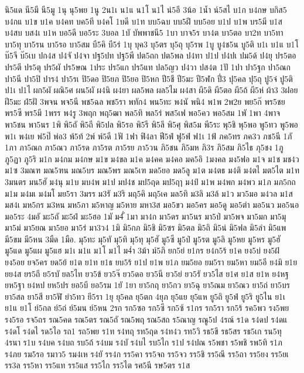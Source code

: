 {นิ5แด
นี5มี
นี5มู
1นุ
นุ5พย
1นู
2น1เ
น1แ
น1โ
น1ไ
น่5อี
3น้อ
1น้ำ
น์5สไ
บ1ก
บ4กษ
บกิส5
บ4กแ
บ1ข
บ1ค
บ4คท
บค5ที
บ4คโ
1บดี
บ1ท
บบ5ฉบ
บบ5ฝึ
บบ5อย
บ1ป
บ1พ
บร5มี
บ1ส
บ4สบ
บส4เ
บ1ห
บอ5ดี
บอ5ระ
3บอล
1บั
บัพพาชนี5
1บา
บาจ5ร
บา4ต
บา5ตอ
บา2ท
บา5ทา
บา5ทุ
บา5รน
บา5รอ
บา5สม
บี5คิ
บี5ร่
1บุ
บุค3
บุ5ตร
บุ5ถุ
บุ5รพ
1บู
บู4ช5น
บู5ติ
บ1เ
บ1แ
บ1โ
บ๊5จี
บ๊5เบ
ปก4ส
ป4จั
ป4จา
ปฐ5ปท
ปฐ5พี
ปต5ถก
ปต5พล
ป4ทา
ป1ป
ป4ปเ
ปม5ด้
ป4ยุ
ปร5ตอ
ปร5ตี
ปร5ตุ
ปร5ผั
ปร5ษณ
1ประ
ปร5แก
ปร5แท
ปล5ญว
ป4วา
ปส4ต
1ปั
1ปา
ปา5ฐก
ปา5ณก
ปา5นี
ปา5ปิ
ปาร4
ปา5รเ
ปิ5ดอ
ปิ5ยภ
ปิ5ยอ
ปิ5หก
ปี5ชี
ปี5มะ
ปี5ฬก
ปี่3
ปุ5คล
ปุ5ถุ
ปู5จ๋
ปู5ติ
ป1เ
ป1ไ
ผก5ผั
ผณิ5ศ
ผน5ผั
ผ4นิ
ผ4ยา
ผล5พล
ผล5ไม
ผ4สา
ผี5ดิ
ผี5ตอ
ผี5ถ้
ผี5ห่
ผ้า3
3ฝอย
ฝี5มะ
ฝ่5ฝั
3พจน
พจ5นี
พช5ฉล
พช5รา
พทัก4
พน5ทะ
พ4นั
พนิ4
พ1พ
2พ2ย
พย5ก๊
พร5ชย
พร5ซี
พร5มี
1พรร
พ4รู
3พฤก
พฤ5ฒา
พล5ทิ
พล5ร่
พส5เฟ
พอ5คว
พอ5สม
1พั
1พา
4พาจ
พา5ชน
พา5นร
1พิ
พิ5ถั
พิ5ถี
พิ5ปล
พิ5รอ
พิ5รี
พิ5ลึ
พิ5ศุ
พิส5ม
พี5ระ
พุ5ชิ
พุ5พอ
พู5ทว
พู5พอ
พ1เ
พ4เย
พ่5ป๊
พ่อ3
พ้5ท้
2พ์
พ์5ดี
1ฟั
1ฟา
ฟิ4ลา
ฟี5ฟ่
ฟู5ฟ่
ฟ1เ
1ฟ้
ภค5ทร
ภค3ว
ภช5นี
1ภั
1ภา
ภา5ณก
ภา5ณว
ภา5รด
ภา5รต
ภา5รย
ภา5วน
ภิ5ชน
ภิ5มห
ภิ3ร
ภิ5สม
ภิ5ไธ
ภุ5ชง
1ภู
ภู5ฏา
ภู5ริ
ม1ก
ม4กม
ม4กษ
ม1ข
ม4ขล
ม1ค
ม4คค
ม4คอ
มค5อิ
1มงคล
มง5ฟอ
ม1จ
ม1ช
มช4ว
ม1ซ
3มณฑ
มณ5ฑน
มณ5บร
มณ5พร
มณ5เฑ
มด5ยอ
มด5ลู
ม1ต
ม4ตธ
ม4ติ
ม4ตไ
มต5ไต
ม1ท
3มนตร
มน5ฮั
ม4นุ
ม1บ
มบ4พ
ม1ป
มป4ช
มป5ฤด
มป5ฤๅ
ม4ป์
ม1พ
ม4พก
ม4พว
ม1ภ
มภ5กถ
ม1ม
ม4มเ
ม4มโ
มย5รา
3มรร
ม3รั
ม3ริ
มฤ5คิ
มฤ5เค
มล5ทิ
ม3ลิ
ม3ล้
ม1ว
มว5มอ
ม4วล
ม1ส
มส4เ
มห5กร
ม3หน
มห5ภา
ม5หาญ
ม5หาย
มหา3ส
มอ5ขว
มอ5คร
มอ5ดู
มอ5ตำ
มอ5นว
มอ5นอ
มอ5ระ
4มอั
มะ5ถั
มะ5ฝ่
มะ5ฮอ
1มั
ม4ั่
1มา
มา4ก
มา5ดร
มา5นร
มา5ป่
มา5พจ
มา5มก
มา5มุ
มา5ม่
มา5ยณ
มา5ยอ
มา5ร่
มา3ว4
1มิ
มิ5กภ
มิ5ชิ
มิ5ซร
มิ5ตล
มิ5ถิ
มิ5น่
มิ5ฟล
มิ5ลำ
มิ5แพ
มี5ขม
มี5หน
3มืด
1มือ.
มุ5ทะ
มุ5ทั
มุ5ทิ
มุ5ทุ
มุ5ฮั
มู5ซี
มู5ป่
มู5รต
มู5ลิ
มู5หย
มู5หร
มู5ฮั
มู5แด
มู5แผ
มู5แฮ
ม1เ
ม1แ
ม1โ
ม1ไ
ม4่า
3ม้า
ม์5ภิ
ยก5ย่
ย1กร
ย4ก5ร้
ย1ค
ยง5บ่
ยง5ฝ้
ยง5อย
ยจ5คร
ยด5ย้
ย1ต
ย1ท
ย1ธ
ยบ5ร้
ย1ป
ย1พ
ย1ภ
ยม5ยอ
ยม5รา
ยม5หา
ยม5อี
ย4มิ
ย1ย
ยย4ส
ยร5ถี
ย5รบั
ยล5ไท
ยว5ข้
ยว5จ๊
ยว5ดอ
ยว5นี
ยว5ย่
ยว5รั
ยว5ไส
ย1ศ
ย1ส
ย1ห
ย4หฐ
ยห5ฐา
ย4หป
ยห5ปร
ยอ5บี
ยอ5รม
1ยั
1ยา
ยา5กฤ
ยา5กว
ยา5ฉุ
ยา5ณม
ยา5ณว
ยา5ถ่
ยา5บร
ยา5สล
ยา5สี
ยา5ฬั
ยำ5ทว
ยี5รา
1ยุ
ยุ5คล
ยุ5ตก
4ยุภ
ยุ5แย
ยุ5แห
ยู5ถิ
ยู5ฟ่
ยู5ริ
ยู5ไน
ย1เ
ย1แ
ย1โ
ย์5กล
ย์5ถ่
ย์5มน
ย์5หน
2รก
รก5ซอ
รก5ซึ
รก5ซ้
ร1กร
รก5รา
รก5ร้
รค5พว
รง5พย
รง5รอ
รจ5ถร
รณ5คด
รณ5ตร
รณ5ถั
รณ5พฤ
รณ5สถ
ร5ณาญ
รณู5ป
4รณ์
ร1ด
ร4ดป
ร4ดแ
ร4ดโ
ร4ดไ
รด5ไอ
รถ1
รถ5พย
ร1ท
ร4ทฤ
รท5ฤด
ร4ท4ว
รท5วิ
รธ5ขึ
รธ5สร
รธ5เก
รน5ทุ
4รนา
ร1บ
ร4บค
ร4บถ
รบ5ถ้
ร4บม
ร4บั
ร4บไ
รบ5ไก
ร1ป
ร4ปณ
ร5พชา
ร5พชิ
รพ5ทิ
ร1ภ
ร4ภย
รม5รอ
รมาว5
รม4เห
ร4ยั
รร4ก
รร5คา
รร5จถ
รร5จว
รร5ชิ
รร5ณึ
รร5ถา
รร5ยง
รร5ยเ
รร3ล
รร5หา
รร5แท
รร5แส
รร5ไก
รร5ไต
รศ5นี
รษ5ตร
ร1ส
}
